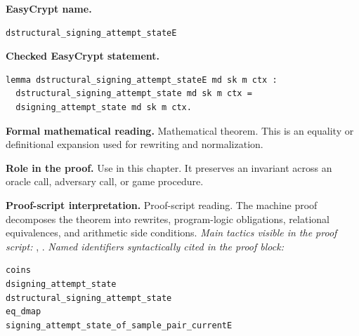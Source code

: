\begin{formaltheorem}
\noindent\textbf{EasyCrypt name.}
\begin{lstlisting}[language=EasyCrypt,basicstyle=\ttfamily\scriptsize]
dstructural_signing_attempt_stateE
\end{lstlisting}
\noindent\textbf{Checked EasyCrypt statement.}
\begin{lstlisting}[language=EasyCrypt,basicstyle=\ttfamily\scriptsize]
lemma dstructural_signing_attempt_stateE md sk m ctx :
  dstructural_signing_attempt_state md sk m ctx =
  dsigning_attempt_state md sk m ctx.
\end{lstlisting}
\noindent\textbf{Formal mathematical reading.}
Mathematical theorem. This is an equality or definitional expansion used for rewriting and normalization.

\noindent\textbf{Role in the proof.}
Use in this chapter. It preserves an invariant across an oracle call, adversary call, or game procedure.

\noindent\textbf{Proof-script interpretation.}
Proof-script reading. The machine proof decomposes the theorem into rewrites, program-logic obligations, relational equivalences, and arithmetic side conditions.
\emph{Main tactics visible in the proof script:} , .
\emph{Named identifiers syntactically cited in the proof block:}
\begin{lstlisting}[language=EasyCrypt,basicstyle=\ttfamily\scriptsize]
coins
dsigning_attempt_state
dstructural_signing_attempt_state
eq_dmap
signing_attempt_state_of_sample_pair_currentE
\end{lstlisting}

\end{formaltheorem}

